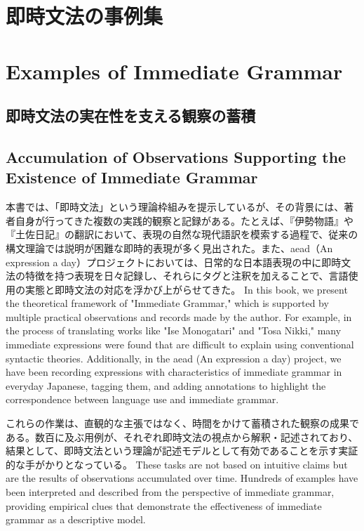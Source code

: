\ifJPN
\section{即時文法の事例集}
\else
\section{Examples of Immediate Grammar}
\fi
\label{sec:immediate_grammar_examples}

\ifJPN
\subsection{即時文法の実在性を支える観察の蓄積}
\else
\subsection{Accumulation of Observations Supporting the Existence of Immediate Grammar} 
\fi
\label{subsec:immediate_grammar_observations}

\ifJPN
本書では、「即時文法」という理論枠組みを提示しているが、その背景には、著者自身が行ってきた複数の実践的観察と記録がある。たとえば、『伊勢物語』や『土佐日記』の翻訳において、表現の自然な現代語訳を模索する過程で、従来の構文理論では説明が困難な即時的表現が多く見出された。また、aead（An expression a day）プロジェクトにおいては、日常的な日本語表現の中に即時文法の特徴を持つ表現を日々記録し、それらにタグと注釈を加えることで、言語使用の実態と即時文法の対応を浮かび上がらせてきた。
\else
In this book, we present the theoretical framework of "Immediate Grammar," which is supported by multiple practical observations and records made by the author. For example, in the process of translating works like "Ise Monogatari" and "Tosa Nikki," many immediate expressions were found that are difficult to explain using conventional syntactic theories. Additionally, in the aead (An expression a day) project, we have been recording expressions with characteristics of immediate grammar in everyday Japanese, tagging them, and adding annotations to highlight the correspondence between language use and immediate grammar.
\fi

\ifJPN
これらの作業は、直観的な主張ではなく、時間をかけて蓄積された観察の成果である。数百に及ぶ用例が、それぞれ即時文法の視点から解釈・記述されており、結果として、即時文法という理論が記述モデルとして有効であることを示す実証的な手がかりとなっている。
\else
These tasks are not based on intuitive claims but are the results of observations accumulated over time. Hundreds of examples have been interpreted and described from the perspective of immediate grammar, providing empirical clues that demonstrate the effectiveness of immediate grammar as a descriptive model.
\fi

